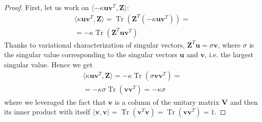 \documentclass[12pt]{article}
\DeclareMathOperator*{\tr}{Tr}
\newcommand{\boldZ}{\mathbf{Z}}
\newcommand{\boldV}{\mathbf{V}}
\newcommand{\boldu}{\mathbf{u}}
\newcommand{\boldv}{\mathbf{v}}
\begin{document}
\begin{proof}
First, let us work on $\langle -\kappa \boldu \boldv^T, \boldZ \rangle$:
\begin{gather}
    \langle \kappa \boldu \boldv^T, \boldZ \rangle = \tr(\boldZ^T (-\kappa \boldu \boldv^T)) = \\
    = -\kappa \tr(\boldZ^T \boldu \boldv^T)
\end{gather}
Thanks to variational characterization of singular vectors, $\boldZ^T \boldu = \sigma \boldv$, where $\sigma$ is the singular value corresponding to the singular vectors $\boldu$ and $\boldv$, i.e. the largest singular value. Hence we get
\begin{gather}
    \langle \kappa \boldu \boldv^T, \boldZ \rangle = -\kappa \tr(\sigma \boldv \boldv^T) = \\
    = -\kappa \sigma \tr(\boldv \boldv^T) = -\kappa \sigma \label{eq:inner-kuv-z}
\end{gather}
where we leveraged the fact that $\boldv$ is a column of the unitary matrix $\boldV$ and then its inner product with itself $\langle \boldv, \boldv \rangle = \tr(\boldv^T\boldv) = \tr(\boldv\boldv^T) = 1$.


\end{proof}
\end{document}
